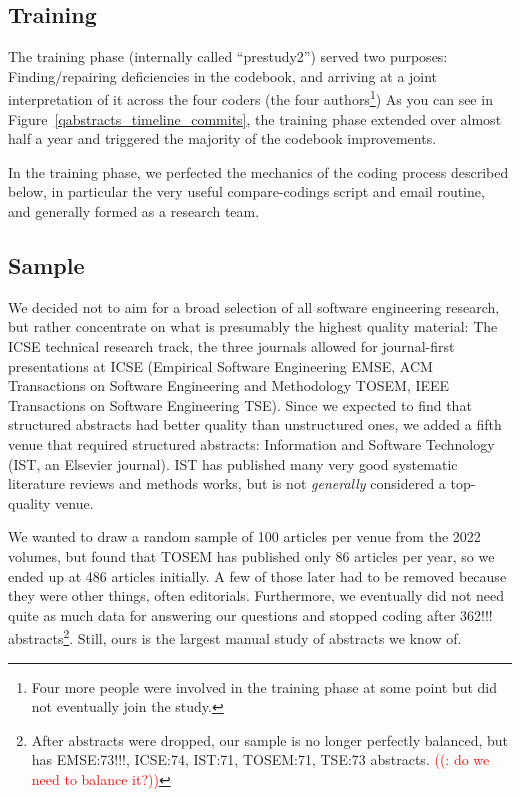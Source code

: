 \documentclass[10pt,journal,compsoc]{IEEEtran}
\newcommand{\Prg}[1]{\bgroup\ttfamily #1\egroup}  %
\newcounter{todonumber}
\newcommand{\Todo}[1]{\stepcounter{todonumber}\textcolor{red}{\sffamily ((\arabic{todonumber}: #1))}}
\begin{document}
\subsection{Training}\label{meth_training}

The training phase (internally called ``prestudy2'') served two purposes:
Finding/repairing deficiencies in the codebook,
and arriving at a joint interpretation of it across the four coders
(the four authors\footnote{Four more people were involved in the training phase at some
  point but did not eventually join the study.})
As you can see in Figure~\ref{qabstracts_timeline_commits},
the training phase extended over almost half a year and triggered
the majority of the codebook improvements.

In the training phase, we perfected the mechanics of the coding process
described below, in particular the very useful \Prg{compare-codings} script
and email routine,
and generally formed as a research team.


\subsection{Sample}\label{meth_sample}

We decided not to aim for a broad selection of all software engineering research,
but rather concentrate on what is presumably the highest quality material:
The ICSE technical research track,
the three journals allowed for journal-first presentations at ICSE
(Empirical Software Engineering EMSE,
ACM Transactions on Software Engineering and Methodology TOSEM,
IEEE Transactions on Software Engineering TSE).
Since we expected to find that structured abstracts had better quality
than unstructured ones, we added a fifth venue that required structured abstracts:
Information and Software Technology (IST, an Elsevier journal).
IST has published many very good systematic literature reviews and methods works,
but is not \emph{generally} considered a top-quality venue.

We wanted to draw a random sample of 100 articles per venue from the
2022 volumes, but found that TOSEM has published only 86 articles per year,
so we ended up at 486 articles initially.
A few of those later had to be removed because they were other things,
often editorials.
Furthermore, we eventually did not need quite as much data for answering our
questions and stopped coding after 362!!! abstracts\footnote{After abstracts 
	were dropped, our sample is no longer perfectly balanced, but has 
    EMSE:73!!!, ICSE:74, IST:71, TOSEM:71, TSE:73 abstracts. \Todo{do we need to balance it?}}.
Still, ours is the largest manual study of abstracts we know of.
\end{document}

